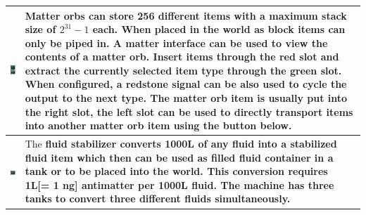 \documentclass[11pt]{article} %
\makeatletter
\newcommand{\imgtex}{\begin{tabularx}{\textwidth}{@{}c@{ }X@{}}}
\makeatother
\begin{document}
\imgtex
\includegraphics[align = t]{blockMatterOrb} & \bf Matter orbs \rm can store 256 different items with a maximum stack size of $2^{31}-1$ each. When placed in the world as block items can only be piped in. A \bf matter interface \rm can be used to view the contents of a matter orb. Insert items through the red slot and extract the currently selected item type through the green slot. When configured, a redstone signal can be also used to cycle the output to the next type. The matter orb item is usually put into the right slot, the left slot can be used to directly transport items into another matter orb item using the button below.\\ \hline 
\includegraphics[align = t]{blockFluidconverter} & The \bf fluid stabilizer \rm converts 1000L of any fluid into a stabilized fluid item which then can be used as filled fluid container in a tank or to be placed into the world. This conversion requires 1L[= 1 ng] antimatter per 1000L fluid. The machine has three tanks to convert three different fluids simultaneously. \\ \hline
\end{tabularx}
\end{document}
